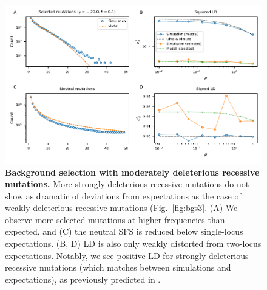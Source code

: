 \documentclass[]{article}
\begin{document}
\begin{figure}[ht!]
    \centering
    \includegraphics{../figures/bgs_gamma_-20.0_h_0.1_n_80}
    \caption{
        \textbf{Background selection with moderately deleterious recessive mutations.}
        More strongly deleterious recessive mutations do not show as dramatic of
        deviations from expectations as the case of weakly deleterious recessive
        mutations (Fig.~\ref{fig:bgs3}.
        (A) We observe more selected mutations at higher frequencies than expected,
        and (C) the neutral SFS is reduced below single-locus expectations.
        (B, D) LD is also only weakly distorted from
        two-locus expectations. Notably, we see positive LD for strongly
        deleterious recessive mutations (which matches between
        simulations and expectations),
        as previously predicted in \citet{Roze2021-cf}.
    }
    \label{fig:bgs4}
\end{figure}
\end{document}
